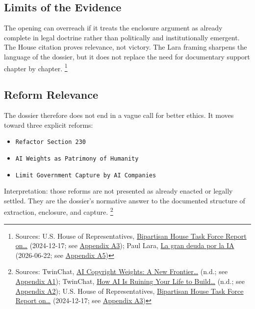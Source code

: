 \documentclass[
  american,
  11pt,
  letterpaper,
]{article}
\providecommand{\tightlist}{%
  \setlength{\itemsep}{0pt}\setlength{\parskip}{0pt}}
\begin{document}
\subsection{Limits of the Evidence}\label{limits-of-the-evidence}

The opening can overreach if it treats the enclosure argument as already
complete in legal doctrine rather than politically and institutionally
emergent. The House citation proves relevance, not victory. The Lara
framing sharpens the language of the dossier, but it does not replace
the need for documentary support chapter by chapter. \footnote{Sources:
  U.S. House of Representatives,
  \href{https://www.speaker.gov/wp-content/uploads/2024/12/AI-Task-Force-Report-FINAL.pdf}{Bipartisan
  House Task Force Report on\ldots{}} (2024-12-17; see
  \hyperref[appendix-a3-bipartisan-house-task-force-report-on-artificial-intelligence]{Appendix
  A3}); Paul Lara,
  \href{https://www.dineroenimagen.com/paul-lara/la-gran-deuda-por-la-ia/186930}{La
  gran deuda por la IA} (2026-06-22; see
  \hyperref[appendix-a5-la-gran-deuda-por-la-ia]{Appendix A5})}

\subsection{Reform Relevance}\label{reform-relevance}

The dossier therefore does not end in a vague call for better ethics. It
moves toward three explicit reforms:

\begin{itemize}
\tightlist
\item
  \texttt{Refactor\ Section\ 230}
\item
  \texttt{AI\ Weights\ as\ Patrimony\ of\ Humanity}
\item
  \texttt{Limit\ Government\ Capture\ by\ AI\ Companies}
\end{itemize}

Interpretation: those reforms are not presented as already enacted or
legally settled. They are the dossier's normative answer to the
documented structure of extraction, enclosure, and capture. \footnote{Sources:
  TwinChat,
  \href{https://medium.com/twinchat/ai-copyright-weights-a-new-frontier-in-intellectual-property-law-d8ee1b6c55ee}{AI
  Copyright Weights: A New Frontier\ldots{}} (n.d.; see
  \hyperref[appendix-a1-ai-copyright-weights-a-new-frontier-in-intellectual-property-law]{Appendix
  A1}); TwinChat,
  \href{https://medium.com/twinchat/how-ai-is-ruining-your-life-to-build-an-empire-8b6d02e55bc9}{How
  AI Is Ruining Your Life to Build\ldots{}} (n.d.; see
  \hyperref[appendix-a2-how-ai-is-ruining-your-life-to-build-an-empire]{Appendix
  A2}); U.S. House of Representatives,
  \href{https://www.speaker.gov/wp-content/uploads/2024/12/AI-Task-Force-Report-FINAL.pdf}{Bipartisan
  House Task Force Report on\ldots{}} (2024-12-17; see
  \hyperref[appendix-a3-bipartisan-house-task-force-report-on-artificial-intelligence]{Appendix
  A3})}
\end{document}
